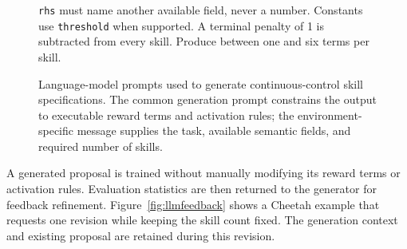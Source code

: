 \documentclass[conference,letterpaper,10pt]{IEEEtran}
\begin{document}
\begin{figure}[!t]
{\begin{minipage}{0.94\textwidth}
\texttt{rhs} must name another available field, never a number. Constants use
\texttt{threshold} when supported. A terminal penalty of 1 is subtracted from every skill.
Produce between one and six terms per skill.
\end{minipage}
}

\vspace{7pt}

\begin{minipage}[t]{0.455\textwidth}
\end{minipage}
\hfill
\begin{minipage}[t]{0.455\textwidth}
\end{minipage}

\caption{Language-model prompts used to generate continuous-control skill specifications. The common generation prompt constrains the output to executable reward terms and activation rules; the environment-specific message supplies the task, available semantic fields, and required number of skills.}
\label{fig:llmprompts}
\end{figure}

A generated proposal is trained without manually modifying its reward terms or activation rules. Evaluation statistics are then returned to the generator for feedback refinement. Figure~\ref{fig:llmfeedback} shows a Cheetah example that requests one revision while keeping the skill count fixed. The generation context and existing proposal are retained during this revision.
\end{document}
